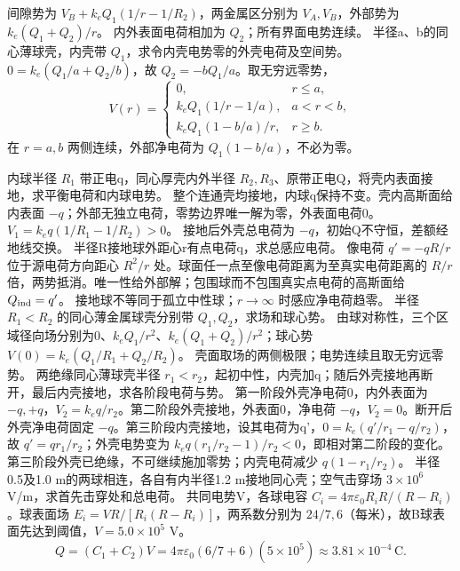 间隙势为 $V_B+k_eQ_1(1/r-1/R_2)$，两金属区分别为 $V_A,V_B$，外部势为 $k_e(Q_1+Q_2)/r$。
\crosscheck 内外表面电荷相加为 $Q_2$；所有界面电势连续。
\problemtext 半径a、b的同心薄球壳，内壳带 $Q_1$，求令内壳电势零的外壳电荷及空间势。
\workings $0=k_e(Q_1/a+Q_2/b)$，故 $Q_2=-bQ_1/a$。取无穷远零势，
\[
V(r)=\begin{cases}0,&r\le a,\\k_eQ_1(1/r-1/a),&a<r<b,\\k_eQ_1(1-b/a)/r,&r\ge b.\end{cases}
\]
\crosscheck 在 $r=a,b$ 两侧连续，外部净电荷为 $Q_1(1-b/a)$，不必为零。

\problemtext 内球半径 $R_1$ 带正电q，同心厚壳内外半径 $R_2,R_3$、原带正电Q，将壳内表面接地，求平衡电荷和内球电势。
\workings 整个连通壳均接地，内球q保持不变。壳内高斯面给内表面 $-q$；外部无独立电荷，零势边界唯一解为零，外表面电荷0。$V_1=k_eq(1/R_1-1/R_2)>0$。
\crosscheck 接地后外壳总电荷为 $-q$，初始Q不守恒，差额经地线交换。
\problemtext 半径R接地球外距心r有点电荷q，求总感应电荷。
\workings 像电荷 $q'=-qR/r$ 位于源电荷方向距心 $R^2/r$ 处。球面任一点至像电荷距离为至真实电荷距离的 $R/r$ 倍，两势抵消。唯一性给外部解；包围球而不包围真实点电荷的高斯面给 $Q_{\rm ind}=q'$。
\crosscheck 接地球不等同于孤立中性球；$r\to\infty$ 时感应净电荷趋零。
\problemtext 半径 $R_1<R_2$ 的同心薄金属球壳分别带 $Q_1,Q_2$，求场和球心势。
\workings 由球对称性，三个区域径向场分别为0、$k_eQ_1/r^2$、$k_e(Q_1+Q_2)/r^2$；球心势 $V(0)=k_e(Q_1/R_1+Q_2/R_2)$。
\crosscheck 壳面取场的两侧极限；电势连续且取无穷远零势。
\problemtext 两绝缘同心薄球壳半径 $r_1<r_2$，起初中性，内壳加q；随后外壳接地再断开，最后内壳接地，求各阶段电荷与势。
\workings 第一阶段外壳净电荷0，内外表面为 $-q,+q$，$V_2=k_eq/r_2$。第二阶段外壳接地，外表面0，净电荷 $-q$，$V_2=0$。断开后外壳净电荷固定 $-q$。第三阶段内壳接地，设其电荷为q'，$0=k_e(q'/r_1-q/r_2)$，故 $q'=qr_1/r_2$；外壳电势变为 $k_eq(r_1/r_2-1)/r_2<0$，即相对第二阶段的变化。
\crosscheck 第三阶段外壳已绝缘，不可继续施加零势；内壳电荷减少 $q(1-r_1/r_2)$。
\problemtext 半径0.5及1.0 m的两球相连，各自有内半径1.2 m接地同心壳；空气击穿场 $3\times10^6$ V/m，求首先击穿处和总电荷。
\workings 共同电势V，各球电容 $C_i=4\pi\varepsilon_0R_iR/(R-R_i)$。球表面场 $E_i=VR/[R_i(R-R_i)]$，两系数分别为 $24/7,6$（每米），故B球表面先达到阈值，$V=5.0\times10^5$ V。
\[
Q=(C_1+C_2)V=4\pi\varepsilon_0(6/7+6)(5\times10^5)\approx3.81\times10^{-4}\,\mathrm C.
\]
